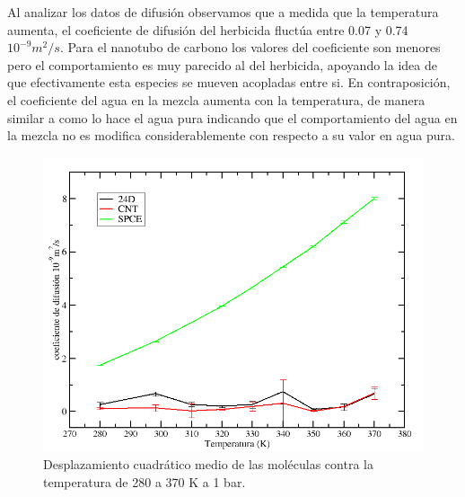 Al analizar los datos de difusión observamos que a medida que la temperatura aumenta, el coeficiente de difusión del herbicida fluctúa entre 0.07 y 0.74 $10^{-9}m^2/s$. Para el nanotubo de carbono los valores del coeficiente son menores  pero el comportamiento es muy parecido al del herbicida, apoyando la idea  de que efectivamente esta especies se mueven acopladas entre si. En contraposición, el coeficiente del agua en la mezcla aumenta con la temperatura, de manera similar a como lo hace el agua pura \cite{moultos2018} indicando que el comportamiento del agua en la mezcla no es modifica considerablemente con respecto a su valor en agua pura.

\begin{figure}[!h]
    \centering
    \includegraphics[width=.8\textwidth,keepaspectratio=true]{resultados/coefdif.png}
    \caption{Desplazamiento cuadrático medio de las moléculas contra la temperatura de 280 a 370 K a 1 bar.}
    \label{fig:coeficientemoleculas}
\end{figure}





